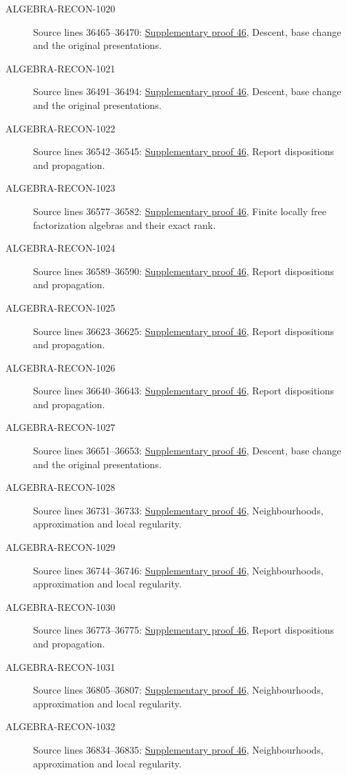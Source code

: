 \begin{description}
\item[ALGEBRA-RECON-1020] Source lines 36465--36470: \hyperlink{algebra_syntomic_notes_20260928}{Supplementary proof 46}, Descent, base change and the original presentations.
\item[ALGEBRA-RECON-1021] Source lines 36491--36494: \hyperlink{algebra_syntomic_notes_20260928}{Supplementary proof 46}, Descent, base change and the original presentations.
\item[ALGEBRA-RECON-1022] Source lines 36542--36545: \hyperlink{algebra_syntomic_notes_20260928}{Supplementary proof 46}, Report dispositions and propagation.
\item[ALGEBRA-RECON-1023] Source lines 36577--36582: \hyperlink{algebra_syntomic_notes_20260928}{Supplementary proof 46}, Finite locally free factorization algebras and their exact rank.
\item[ALGEBRA-RECON-1024] Source lines 36589--36590: \hyperlink{algebra_syntomic_notes_20260928}{Supplementary proof 46}, Report dispositions and propagation.
\item[ALGEBRA-RECON-1025] Source lines 36623--36625: \hyperlink{algebra_syntomic_notes_20260928}{Supplementary proof 46}, Report dispositions and propagation.
\item[ALGEBRA-RECON-1026] Source lines 36640--36643: \hyperlink{algebra_syntomic_notes_20260928}{Supplementary proof 46}, Report dispositions and propagation.
\item[ALGEBRA-RECON-1027] Source lines 36651--36653: \hyperlink{algebra_syntomic_notes_20260928}{Supplementary proof 46}, Descent, base change and the original presentations.
\item[ALGEBRA-RECON-1028] Source lines 36731--36733: \hyperlink{algebra_syntomic_notes_20260928}{Supplementary proof 46}, Neighbourhoods, approximation and local regularity.
\item[ALGEBRA-RECON-1029] Source lines 36744--36746: \hyperlink{algebra_syntomic_notes_20260928}{Supplementary proof 46}, Neighbourhoods, approximation and local regularity.
\item[ALGEBRA-RECON-1030] Source lines 36773--36775: \hyperlink{algebra_syntomic_notes_20260928}{Supplementary proof 46}, Report dispositions and propagation.
\item[ALGEBRA-RECON-1031] Source lines 36805--36807: \hyperlink{algebra_syntomic_notes_20260928}{Supplementary proof 46}, Neighbourhoods, approximation and local regularity.
\item[ALGEBRA-RECON-1032] Source lines 36834--36835: \hyperlink{algebra_syntomic_notes_20260928}{Supplementary proof 46}, Neighbourhoods, approximation and local regularity.

\end{description}
